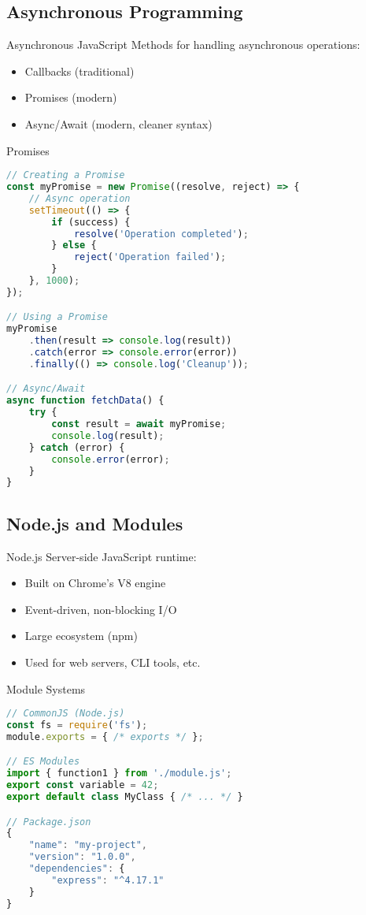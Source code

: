 \subsection{Asynchronous Programming}

\begin{concept}{Asynchronous JavaScript}
    Methods for handling asynchronous operations:
    \begin{itemize}
        \item Callbacks (traditional)
        \item Promises (modern)
        \item Async/Await (modern, cleaner syntax)
    \end{itemize}
\end{concept}

\begin{KR}{Promises}
\begin{lstlisting}[language=JavaScript, style=basesmol]
// Creating a Promise
const myPromise = new Promise((resolve, reject) => {
    // Async operation
    setTimeout(() => {
        if (success) {
            resolve('Operation completed');
        } else {
            reject('Operation failed');
        }
    }, 1000);
});

// Using a Promise
myPromise
    .then(result => console.log(result))
    .catch(error => console.error(error))
    .finally(() => console.log('Cleanup'));

// Async/Await
async function fetchData() {
    try {
        const result = await myPromise;
        console.log(result);
    } catch (error) {
        console.error(error);
    }
}
\end{lstlisting}
\end{KR}

\subsection{Node.js and Modules}

\begin{concept}{Node.js}
    Server-side JavaScript runtime:
    \begin{itemize}
        \item Built on Chrome's V8 engine
        \item Event-driven, non-blocking I/O
        \item Large ecosystem (npm)
        \item Used for web servers, CLI tools, etc.
    \end{itemize}
\end{concept}

\begin{KR}{Module Systems}
\begin{lstlisting}[language=JavaScript, style=basesmol]
// CommonJS (Node.js)
const fs = require('fs');
module.exports = { /* exports */ };

// ES Modules
import { function1 } from './module.js';
export const variable = 42;
export default class MyClass { /* ... */ }

// Package.json
{
    "name": "my-project",
    "version": "1.0.0",
    "dependencies": {
        "express": "^4.17.1"
    }
}
\end{lstlisting}
\end{KR}